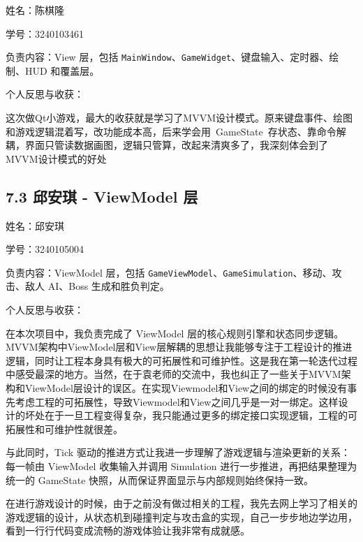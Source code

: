 \documentclass[12pt,fontset=none]{ctexart}
\begin{document}
姓名：陈棋隆

学号：3240103461

负责内容：View 层，包括 \texttt{MainWindow}、\texttt{GameWidget}、键盘输入、定时器、绘制、HUD 和覆盖层。

个人反思与收获：

这次做Qt小游戏，最大的收获就是学习了MVVM设计模式。原来键盘事件、绘图和游戏逻辑混着写，改功能成本高，后来学会用 GameState 存状态、靠命令解耦，界面只管读数据画图，逻辑只管算，改起来清爽多了，我深刻体会到了MVVM设计模式的好处

\subsection{7.3 邱安琪 - ViewModel 层}

姓名：邱安琪

学号：3240105004

负责内容：ViewModel 层，包括 \texttt{GameViewModel}、\texttt{GameSimulation}、移动、攻击、敌人 AI、Boss 生成和胜负判定。

个人反思与收获：

在本次项目中，我负责完成了 ViewModel 层的核心规则引擎和状态同步逻辑。MVVM架构中ViewModel层和View层解耦的思想让我能够专注于工程设计的推进逻辑，同时让工程本身具有极大的可拓展性和可维护性。这是我在第一轮迭代过程中感受最深的地方。当然，在于袁老师的交流中，我也纠正了一些关于MVVM架构和ViewModel层设计的误区。在实现Viewmodel和View之间的绑定的时候没有事先考虑工程的可拓展性，导致Viewmodel和View之间几乎是一对一绑定。这样设计的坏处在于一旦工程变得复杂，我只能通过更多的绑定接口实现逻辑，工程的可拓展性和可维护性就很差。  

与此同时，Tick 驱动的推进方式让我进一步理解了游戏逻辑与渲染更新的关系：每一帧由 ViewModel 收集输入并调用 Simulation 进行一步推进，再把结果整理为统一的 GameState 快照，从而保证界面显示与内部规则始终保持一致。  

在进行游戏设计的时候，由于之前没有做过相关的工程，我先去网上学习了相关的游戏逻辑的设计，从状态机到碰撞判定与攻击盒的实现，自己一步步地边学边用，看到一行行代码变成流畅的游戏体验让我非常有成就感。
\end{document}

